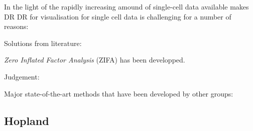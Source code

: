 
In the light of the rapidly increasing amound of single-cell data available makes DR 
DR for visualisation for single cell data is challenging for a number of reasons:







Solutions from literature:

\textit{Zero Inflated Factor Analysis} (ZIFA) has been developped.




Judgement:


Major state-of-the-art methods that have been developed by other groups:

\subsection{Hopland}

